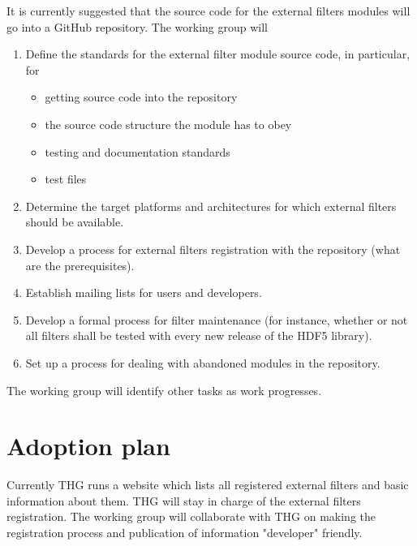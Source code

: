 \documentclass{scrartcl}
\begin{document}
It is currently suggested that the source code for the external filters modules will go into a GitHub repository. The working group will
\begin{enumerate}

    \item Define the standards for the external filter module source code, in particular, for
        \begin{itemize}
            \item getting source code into the repository
            \item the source code structure the module has to obey 
            \item testing and documentation standards 
            \item test files
           
        \end{itemize}
     \item Determine the target platforms and architectures for which external
        filters should be available.  
    \item Develop a process for external filters registration with
        the repository (what are the prerequisites).
    \item Establish mailing lists for users and developers.
    \item Develop a formal process for filter maintenance (for instance, whether
        or not all filters shall be tested with every new release of the HDF5 library).
    \item Set up a process for dealing with abandoned modules in the
        repository. 
\end{enumerate}
The working group will identify other tasks as work progresses.

\section{Adoption plan}

Currently THG runs a website which lists all registered external 
filters and basic information about them. THG will stay in
charge of the external filters registration. The working group will collaborate with THG on making the registration process and publication of information
"developer" friendly.
\end{document}
